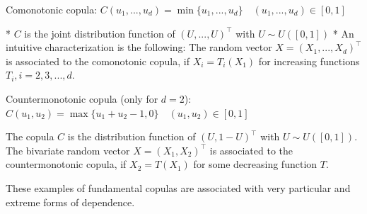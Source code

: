 Comonotonic copula:
\(C(u_1, ..., u_d) = \min \{u_1, ..., u_d\} \quad (u_1, ..., u_d) \in [0, 1]\)

* \(C\) is the joint distribution function of \((U, ..., U)^\top\) with \(U \sim U([0, 1])\)
* An intuitive characterization is the following: The random vector \(X = (X_1, ..., X_d)^\top\) is associated to the comonotonic copula, 
if \(X_i = T_i(X_1)\) for increasing functions \(T_i, i = 2, 3, ..., d\).

Countermonotonic copula (only for \(d = 2\)):
\(C(u_1, u_2) = \max \{u_1 + u_2 - 1, 0\} \quad (u_1, u_2) \in [0, 1]\)

The copula \(C\) is the distribution function of \((U, 1 - U)^\top\) with \(U \sim U([0, 1])\).
The bivariate random vector \(X = (X_1, X_2)^\top\) is associated to the countermonotonic copula, 
if \(X_2 = T(X_1)\) for some decreasing function \(T\).

These examples of fundamental copulas are associated with very particular 
and extreme forms of dependence.
